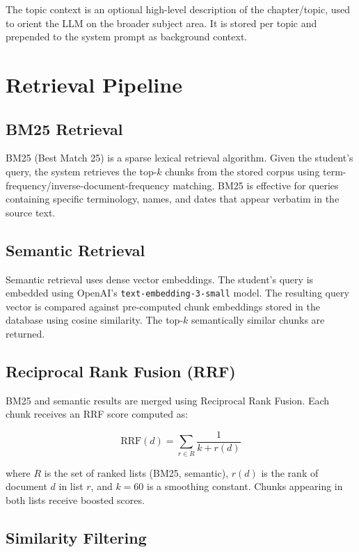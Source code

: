\documentclass[12pt, a4paper]{report}
\newcommand{\codeinline}[1]{\texttt{#1}}
\begin{document}
The topic context is an optional high-level description of the chapter/topic,
used to orient the LLM on the broader subject area. It is stored per topic and
prepended to the system prompt as background context.

\section{Retrieval Pipeline}

\subsection{BM25 Retrieval}

BM25 (Best Match 25) is a sparse lexical retrieval algorithm. Given the student's
query, the system retrieves the top-$k$ chunks from the stored corpus using
term-frequency/inverse-document-frequency matching. BM25 is effective for
queries containing specific terminology, names, and dates that appear verbatim
in the source text.

\subsection{Semantic Retrieval}

Semantic retrieval uses dense vector embeddings. The student's query is embedded
using OpenAI's \codeinline{text-embedding-3-small} model. The resulting query
vector is compared against pre-computed chunk embeddings stored in the database
using cosine similarity. The top-$k$ semantically similar chunks are returned.

\subsection{Reciprocal Rank Fusion (RRF)}

BM25 and semantic results are merged using Reciprocal Rank Fusion. Each chunk
receives an RRF score computed as:

\[
\text{RRF}(d) = \sum_{r \in R} \frac{1}{k + r(d)}
\]

where $R$ is the set of ranked lists (BM25, semantic), $r(d)$ is the rank of
document $d$ in list $r$, and $k = 60$ is a smoothing constant. Chunks
appearing in both lists receive boosted scores.

\subsection{Similarity Filtering}
\end{document}
